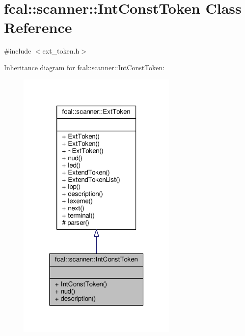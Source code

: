 \hypertarget{classfcal_1_1scanner_1_1IntConstToken}{}\section{fcal\+:\+:scanner\+:\+:Int\+Const\+Token Class Reference}
\label{classfcal_1_1scanner_1_1IntConstToken}


{\ttfamily \#include $<$ext\+\_\+token.\+h$>$}



Inheritance diagram for fcal\+:\+:scanner\+:\+:Int\+Const\+Token\+:
\nopagebreak
\begin{figure}[H]
\begin{center}
\leavevmode
\includegraphics[width=223pt]{classfcal_1_1scanner_1_1IntConstToken__inherit__graph}
\end{center}
\end{figure}


